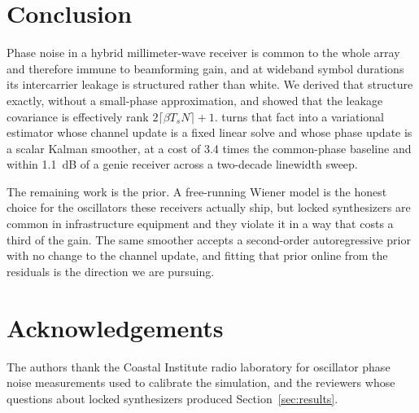 \section{Conclusion}
\label{sec:conclusion}

Phase noise in a hybrid millimeter-wave receiver is common to the whole array
and therefore immune to beamforming gain, and at wideband symbol durations its
intercarrier leakage is structured rather than white. We derived that structure
exactly, without a small-phase approximation, and showed that the leakage
covariance is effectively rank $2\lceil \beta T_s N \rceil + 1$. \est{} turns
that fact into a variational estimator whose channel update is a fixed linear
solve and whose phase update is a scalar Kalman smoother, at a cost of 3.4
times the common-phase baseline and within 1.1~dB of a genie receiver across a
two-decade linewidth sweep.

The remaining work is the prior. A free-running Wiener model is the honest
choice for the oscillators these receivers actually ship, but locked
synthesizers are common in infrastructure equipment and they violate it in a
way that costs a third of the gain. The same smoother accepts a second-order
autoregressive prior with no change to the channel update, and fitting that
prior online from the residuals is the direction we are pursuing.

\section*{Acknowledgements}
The authors thank the Coastal Institute radio laboratory for oscillator phase
noise measurements used to calibrate the simulation, and the reviewers whose
questions about locked synthesizers produced Section~\ref{sec:results}.
